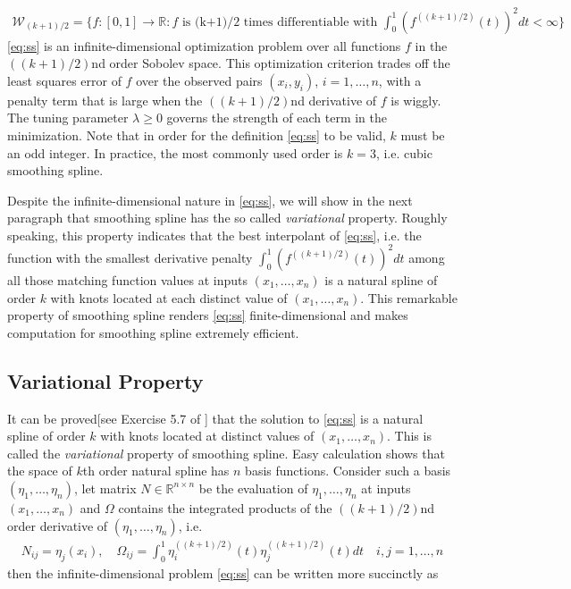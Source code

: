 \documentclass[a4paper]{article}
\newcommand{\RR}{\mathbb{R}}
\renewcommand{\cal}{\mathcal}
\begin{document}
\begin{align*}
\cal{W}_{(k+1)/2} = \big\{f:[0,1]\rightarrow \RR:f\text{ is (k+1)/2 times differentiable with } \int_0^1(f^{((k+1)/2)}(t))^2dt<\infty\big\}
\end{align*}
\eqref{eq:ss} is an infinite-dimensional optimization problem over all functions $f$ in the $((k+1)/2)$nd order Sobolev space. This optimization criterion trades off the least squares error of $f$ over the observed pairs $(x_i, y_i)$, $i=1,\ldots, n$, with a penalty term that is large when the $((k+1)/2)$nd derivative of $f$ is wiggly. The tuning parameter $\lambda \geq 0$ governs the strength of each term in the minimization. Note that in order for the definition \eqref{eq:ss} to be valid, $k$ must be an odd integer. In practice, the most commonly used order is $k = 3$, i.e. cubic smoothing spline. 

Despite the infinite-dimensional nature in \eqref{eq:ss}, we will show in the next paragraph that smoothing spline has the so called \textit{variational} property. Roughly speaking, this property indicates that the best interpolant of \eqref{eq:ss}, i.e. the function with the smallest derivative penalty $\int_0^1(f^{((k+1)/2)}(t))^2dt$ among all those matching function values at inputs $(x_1,\ldots, x_n)$ is a natural spline of order $k$ with knots located at each distinct value of $(x_1,\ldots, x_n)$. This remarkable property of smoothing spline renders \eqref{eq:ss} finite-dimensional and makes computation for smoothing spline extremely efficient.

\subsection{Variational Property}
\label{subsec:var_property}
It can be proved[see Exercise 5.7 of \cite{friedman2001elements}] that the solution to \eqref{eq:ss} is a natural spline of order $k$ with knots located at distinct values of $(x_1,\ldots, x_n)$. This is called the \textit{variational} property of smoothing spline\cite{anselone1968general}. Easy calculation shows that the space of $k$th order natural spline has $n$ basis functions. Consider such a basis $(\eta_1,\ldots, \eta_n)$, let matrix $N\in\RR^{n\times n}$ be the evaluation of $\eta_1,\ldots, \eta_n$ at inputs $(x_1,\ldots, x_n)$ and $\Omega$ contains the integrated products of the $((k+1)/2)$nd order derivative of $(\eta_1,\ldots, \eta_n)$, i.e.
\begin{align}
N_{ij} = \eta_j(x_i), \quad \Omega_{ij} = \int_0^1 \eta_i^{((k+1)/2)}(t)\eta_j^{((k+1)/2)}(t)dt \quad i,j=1,\ldots,n
\label{eq:ss_N}
\end{align}
then the infinite-dimensional problem \eqref{eq:ss} can be written more succinctly as
\end{document}
